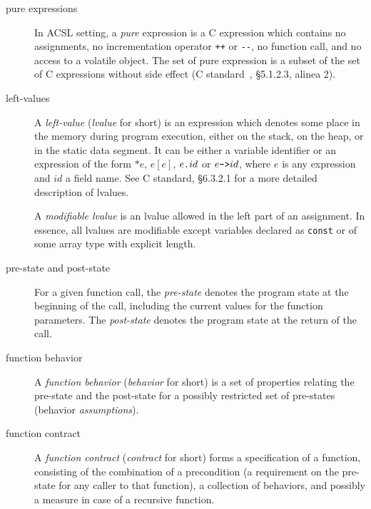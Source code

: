 \documentclass[a4paper,11pt,twoside,openright]{report}
\begin{document}
\begin{description}
\item[pure expressions]  In ACSL setting, a
  \emph{pure} expression is a C expression which contains no assignments, no
  incrementation operator \verb|++| or \verb|--|, no function call,
  and no access to a volatile object. The set of pure expression is a
  subset of the set of C expressions without side effect (C
  standard~\cite{KR88,standardc99}, \S 5.1.2.3, alinea 2).

\item[left-values]  

  A \emph{left-value} (\emph{lvalue} for short) is an expression which
  denotes some place in the memory during program execution, either on
  the stack, on the heap, or in the static data segment. It can be
  either a variable identifier or an expression of the form $*e$,
  $e[e]$, $e\verb|.|id$ or $e\verb|->|id$, where $e$ is any expression
  and $id$ a field name. See C standard, \S 6.3.2.1 for a more
  detailed description of lvalues.

  A \emph{modifiable lvalue} is an lvalue allowed in the left part of
  an assignment. In essence, all lvalues are modifiable except
  variables declared as \texttt{const} or of some array type with
  explicit length.

  
 
\item[pre-state and post-state]
    
    For a given function call, the \emph{pre-state} denotes the
    program state at the beginning of the call, including the
    current values for the function parameters. The \emph{post-state}
    denotes the program state at the return of the call.

\item[function behavior]  

  A \emph{function behavior} (\emph{behavior} for short) is a set of
  properties relating the pre-state and the post-state for a
  possibly restricted set of pre-states (behavior \emph{assumptions}).

\item[function contract]   

  A \emph{function contract} (\emph{contract} for short) forms a
  specification of a function, consisting of the combination of a
  precondition (a requirement on the pre-state for any caller to that
  function), a collection of behaviors, and possibly a measure in case
  of a recursive function.

\end{description}
\end{document}
